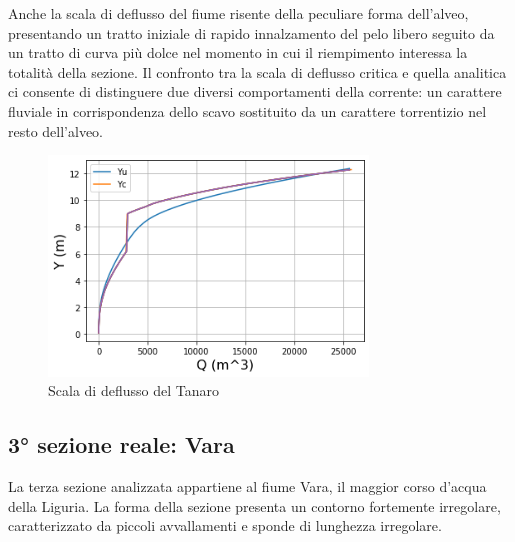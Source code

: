 \documentclass[12pt]{article} %
\begin{document}
\noindent Anche la scala di deflusso del fiume risente della peculiare forma dell’alveo, presentando un tratto iniziale di rapido innalzamento del pelo libero seguito da un tratto di curva più dolce nel momento in cui il riempimento interessa la totalità della sezione. Il confronto tra la scala di deflusso critica e quella analitica ci consente di distinguere due diversi comportamenti della corrente: un carattere fluviale in corrispondenza dello scavo sostituito da un carattere torrentizio nel resto dell’alveo.

\begin{figure}[H]
    \centering
    \includegraphics[width=8.5cm]{deflussota.png}
    \caption{Scala di deflusso del Tanaro}
    \label{fig:Tanaro_scala_deflusso}
\end{figure}

\subsection{3° sezione reale: Vara}

\noindent La terza sezione analizzata appartiene al fiume Vara, il maggior corso d’acqua della Liguria.
La forma della sezione presenta un contorno fortemente irregolare, caratterizzato da piccoli avvallamenti e sponde di lunghezza irregolare.
\end{document}
